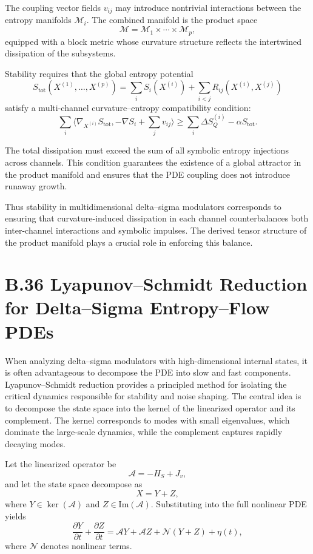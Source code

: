 The coupling vector fields \(v_{ij}\) may introduce nontrivial interactions between the entropy manifolds \(\mathcal{M}_{i}\). The combined manifold is the product space
\[
\mathcal{M} = \mathcal{M}_{1}\times\cdots\times\mathcal{M}_{p},
\]
equipped with a block metric whose curvature structure reflects the intertwined dissipation of the subsystems.

Stability requires that the global entropy potential
\[
S_{\mathrm{tot}}(X^{(1)},\ldots,X^{(p)})
= \sum_{i} S_{i}(X^{(i)})
+ \sum_{i<j} R_{ij}(X^{(i)},X^{(j)})
\]
satisfy a multi-channel curvature–entropy compatibility condition:
\[
\sum_{i}
\langle \nabla_{X^{(i)}} S_{\mathrm{tot}}, 
-\nabla S_{i} + \sum_{j} v_{ij} \rangle
\ge 
\sum_{i}\Delta S_{Q}^{(i)}
- \alpha S_{\mathrm{tot}}.
\]

The total dissipation must exceed the sum of all symbolic entropy injections across channels. This condition guarantees the existence of a global attractor in the product manifold and ensures that the PDE coupling does not introduce runaway growth.

Thus stability in multidimensional delta–sigma modulators corresponds to ensuring that curvature-induced dissipation in each channel counterbalances both inter-channel interactions and symbolic impulses. The derived tensor structure of the product manifold plays a crucial role in enforcing this balance.

\section{B.36 Lyapunov–Schmidt Reduction for Delta–Sigma Entropy–Flow PDEs}

When analyzing delta–sigma modulators with high-dimensional internal states, it is often advantageous to decompose the PDE into slow and fast components. Lyapunov–Schmidt reduction provides a principled method for isolating the critical dynamics responsible for stability and noise shaping. The central idea is to decompose the state space into the kernel of the linearized operator and its complement. The kernel corresponds to modes with small eigenvalues, which dominate the large-scale dynamics, while the complement captures rapidly decaying modes.

Let the linearized operator be
\[
\mathcal{A} = -H_{S} + J_{v},
\]
and let the state space decompose as
\[
X = Y + Z,
\]
where \(Y\in \ker(\mathcal{A})\) and \(Z\in \mathrm{Im}(\mathcal{A})\). Substituting into the full nonlinear PDE yields
\[
\frac{\partial Y}{\partial t} + \frac{\partial Z}{\partial t}
= \mathcal{A}Y + \mathcal{A}Z + \mathcal{N}(Y+Z) + \eta(t),
\]
where \(\mathcal{N}\) denotes nonlinear terms.

